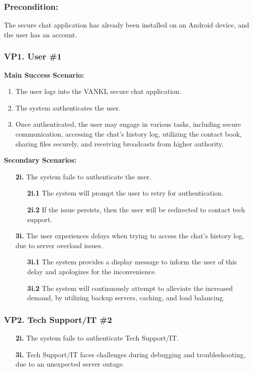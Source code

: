 \documentclass[]{article}
\begin{document}
\subsubsection*{Precondition:} The secure chat application has already been installed on an Android device, and the user has an account.
\subsubsection*{VP1. User \#1}
\textbf{Main Success Scenario:}
\begin{enumerate}
	\item The user logs into the VANKL secure chat application.
	\item The system authenticates the user.
	\item Once authenticated, the user may engage in various tasks, including secure communication, accessing the chat’s history log, utilizing the contact book, sharing files securely, and receiving broadcasts from higher authority.
\end{enumerate}
\textbf{Secondary Scenarios:}
\begin{enumerate}
	\item[\textbf{2i.}] The system fails to authenticate the user.
		\begin{enumerate}
			\item[\textbf{2i.1}] The system will prompt the user to retry for authentication.
			\item[\textbf{2i.2}] If the issue persists, then the user will be redirected to contact tech support.
		\end{enumerate}
	\item[\textbf{3i.}] The user experiences delays when trying to access the chat’s history log, due to server overload issues.
		\begin{enumerate}
			\item[\textbf{3i.1}] The system provides a display message to inform the user of this delay and apologizes for the inconvenience.
			\item[\textbf{3i.2}] The system will continuously attempt to alleviate the increased demand, by utilizing backup servers, caching, and load balancing.
		\end{enumerate}
\end{enumerate}
\subsubsection*{VP2. Tech Support/IT \#2}
\begin{enumerate}
	\item[\textbf{2i.}] The system fails to authenticate Tech Support/IT.
	\item[\textbf{3i.}] Tech Support/IT faces challenges during debugging and troubleshooting, due to an unexpected server outage.
\end{enumerate}
\end{document}

